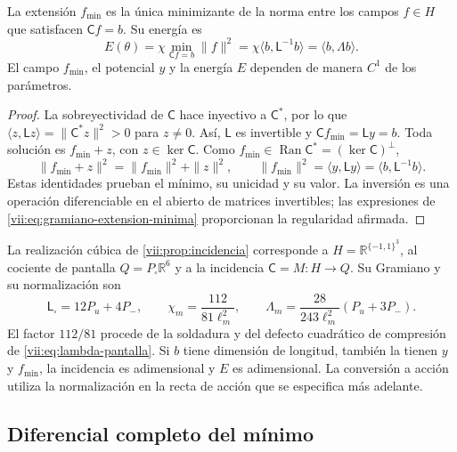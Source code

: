\begin{proposition}
\label{vii:prop:minimo-parametrizado}
La extensión \(f_{\min}\) es la única minimizante de la norma entre
los campos \(f\in H\) que satisfacen \(\mathsf C f=b\). Su energía es
\begin{equation}
 E(\theta)=\chi\min_{\mathsf C f=b}\|f\|^2
 =\chi\langle b,\mathsf L^{-1}b\rangle
 =\langle b,\Lambda b\rangle.
 \label{vii:eq:energia-extension-minima}
\end{equation}
El campo \(f_{\min}\), el potencial \(y\) y la energía \(E\)
dependen de manera \(C^1\) de los parámetros.
\end{proposition}

\begin{proof}
La sobreyectividad de \(\mathsf C\) hace inyectivo a \(\mathsf C^*\),
por lo que \(\langle z,\mathsf Lz\rangle=\|\mathsf C^*z\|^2>0\)
para \(z\ne0\). Así, \(\mathsf L\) es invertible y
\(\mathsf C f_{\min}=\mathsf L y=b\). Toda solución es
\(f_{\min}+z\), con \(z\in\ker\mathsf C\). Como
\(f_{\min}\in\operatorname{Ran}\mathsf C^*=(\ker\mathsf C)^\perp\),
\[
 \|f_{\min}+z\|^2=\|f_{\min}\|^2+\|z\|^2,
 \qquad
 \|f_{\min}\|^2=\langle y,\mathsf L y\rangle
 =\langle b,\mathsf L^{-1}b\rangle.
\]
Estas identidades prueban el mínimo, su unicidad y su valor. La inversión
es una operación diferenciable en el abierto de matrices invertibles;
las expresiones de \eqref{vii:eq:gramiano-extension-minima} proporcionan
la regularidad afirmada.
\end{proof}

La realización cúbica de \ref{vii:prop:incidencia} corresponde a
\(H=\mathbb R^{\{-1,1\}^3}\), al cociente de pantalla
\(Q=P_\square\mathbb R^6\) y a la incidencia \(\mathsf C=M:H\to Q\).
Su Gramiano y su normalización son
\begin{equation}
 \mathsf L_\square=12P_u+4P_-,\qquad
 \chi_m=\frac{112}{81\ell_m^2},\qquad
 \Lambda_m=\frac{28}{243\ell_m^2}(P_u+3P_-).
 \label{vii:eq:normalizacion-minimo-cubico}
\end{equation}
El factor \(112/81\) procede de la soldadura y del defecto cuadrático
de compresión de \eqref{vii:eq:lambda-pantalla}. Si \(b\) tiene dimensión
de longitud, también la tienen \(y\) y \(f_{\min}\), la incidencia es
adimensional y \(E\) es adimensional. La conversión a acción utiliza
la normalización en la recta de acción que se especifica más adelante.

\subsection{Diferencial completo del mínimo}
\label{vii:subsec:diferencial-minimo}

